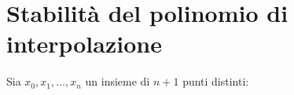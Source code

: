 \section{Stabilità del polinomio di interpolazione}
\label{sec:stabilita-pol-interpolazione}

Sia $x_{0} ,x_{1} ,\dotsc ,x_{n}$ un insieme di $n+1$ punti distinti:

\begin{figure}[htpb]
	\centering

	\begin{tikzpicture}[x=0.75pt,y=0.75pt,yscale=-1,xscale=1]


\end{tikzpicture}
\end{figure}
